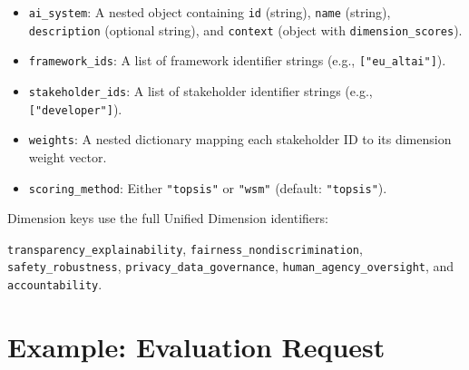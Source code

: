 \begin{itemize}[leftmargin=2em]
  \item \texttt{ai\_system}: A nested object containing \texttt{id} (string), \texttt{name} (string), \texttt{description} (optional string), and \texttt{context} (object with \texttt{dimension\_scores}).
  \item \texttt{framework\_ids}: A list of framework identifier strings (e.g., \texttt{["eu\_altai"]}).
  \item \texttt{stakeholder\_ids}: A list of stakeholder identifier strings (e.g., \texttt{["developer"]}).
  \item \texttt{weights}: A nested dictionary mapping each stakeholder ID to its dimension weight vector.
  \item \texttt{scoring\_method}: Either \texttt{"topsis"} or \texttt{"wsm"} (default: \texttt{"topsis"}).
\end{itemize}

Dimension keys use the full Unified Dimension identifiers:
\begin{flushleft}
{\footnotesize\texttt{transparency\_explainability}}, {\footnotesize\texttt{fairness\_nondiscrimination}}, {\footnotesize\texttt{safety\_robustness}}, {\footnotesize\texttt{privacy\_data\_governance}}, {\footnotesize\texttt{human\_agency\_oversight}}, and {\footnotesize\texttt{accountability}}.
\end{flushleft}

\section{Example: Evaluation Request}

